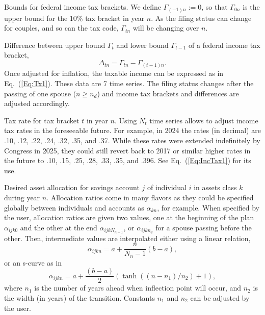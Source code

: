 \documentclass{report}[fleqn,11pt]
\begin{document}
\begin{description}[leftmargin=4em,style=multiline]
\item [$\Gamma_{tn}$]
	Bounds for federal income tax brackets. We define $\Gamma_{(-1)n} := 0$, so that
	$\Gamma_{0n}$ is the upper bound for the 10\% tax bracket in year $n$. As the filing status
	can change for couples, and so can the tax code, $\Gamma_{tn}$ will be changing over $n$.
\item [$\Delta_{tn}$]
	Difference between upper bound $\Gamma_t$ and lower bound $\Gamma_{t-1}$
	of a federal income tax bracket,
	\begin{equation}
		\Delta_{tn} = \Gamma_{tn} - \Gamma_{(t-1)n}.
	\end{equation}
	Once adjusted for inflation,
	the taxable income can be expressed as in Eq.~(\ref{Eq:Tx1}). These data are 7 time series.
	The filing status changes after the passing of one spouse ($n \ge n_d$) and income tax
	brackets and differences are adjusted accordingly.
\item [$\theta_{tn}$]
	Tax rate for tax bracket $t$ in year $n$. Using $N_t$ time series allows to adjust income
	tax rates in the foreseeable future.
	For example, in 2024 the rates (in decimal) are .10, .12, .22, .24, .32, .35, and .37.
        While these rates were extended indefinitely by Congress in 2025, they could still
	revert back to 2017 or similar higher rates in the future to
	.10, .15, .25, .28, .33, .35, and .396. See Eq.~(\ref{Eq:IncTax1}) for its use.
\item [$\alpha_{ijkn}$]
	Desired asset allocation for savings account $j$ of individual $i$ in
	assets class $k$ during year $n$.
	Allocation ratios come in many flavors as they could be specified globally between
	individuals and accounts as $\alpha_{kn}$, for example.
	When specified by the user, allocation ratios are given two values, one at the
	beginning of the plan $\alpha_{ijk0}$ and the other at the end
	$\alpha_{ijkN_{n-1}}$, or $\alpha_{ijkn_d}$ for a spouse passing before the other.
        Then, intermediate values are interpolated either using
	a linear relation,
\begin{equation}
	\alpha_{ijkn} = a + \frac{n}{N_n - 1} (b - a),
\end{equation}
or an s-curve as in
\begin{equation}
	\alpha_{ijkn} = a + \frac{(b - a)}{2}
	(\tanh((n-n_1)/n_2) + 1),
\end{equation}
	where $n_1$ is the number of years ahead when inflection point will occur, and $n_2$ is the
	width (in years) of the transition. Constants $n_1$ and $n_2$ can be adjusted by the user.

\end{description}
\end{document}
